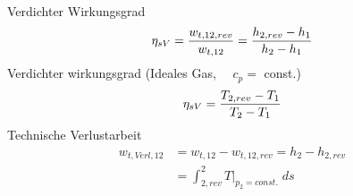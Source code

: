 \documentclass[twocolumn]{article}
\begin{document}
\begin{multicols}{2}
\begin{tikzpicture}
\end{tikzpicture}
\\

	
Verdichter Wirkungsgrad
\begin{equation*}
	\eta_{sV} = \frac{w_{t,12,rev}}{w_{t,12}} = \frac{h_{2,rev} - h_1}{h_2 - h_1} \\
\end{equation*}
Verdichter wirkungsgrad (Ideales Gas, $\quad c_p = $ const.)
\begin{equation*}
	\eta_{sV} = \frac{T_{2,rev} - T_1}{T_2 -T_1} \\
\end{equation*}
Technische Verlustarbeit
\begin{align*}
	w_{t,Verl,12} 	&= w_{t,12} - w_{t,12,rev} = h_2 - h_{2,rev} \\
			&= \int_{2,rev}^{2} T|_{p_2=const.}\; ds
\end{align*}

\end{multicols}
\end{document}
